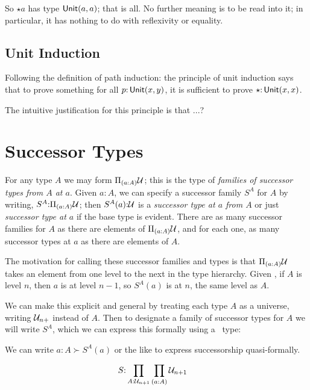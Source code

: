 \documentclass{article}
\begin{document}
So \(\star a\) has type \(\textsf{Unit}(a,a)\); that is all.  No further
meaning is to be read into it; in particular, it has nothing to do
with reflexivity or equality.

\subsection{Unit Induction}

Following the definition of path induction: the principle of unit
induction says that to prove something for all \(p{:}\,\textsf{Unit}(x,y)\),
it is sufficient to prove \(\star{:}\,\textsf{Unit}(x,x)\).

The intuitive justification for this principle is that ...?


\section{Successor Types}

For any type \(A\) we may form \(\Pi_{(a:A)}\mathcal{U}\); this is the type of
\emph{families of successor types from \(A\) at \(a\)}.  Given
\(a{:}A\), we can specify a successor family \(S^A\) for \(A\) by
writing, \(S^A{:}\Pi_{(a:A)}\mathcal{U}\); then \(S^A(a){:}\mathcal{U}\) is a
\emph{successor type at \(a\) from \(A\)} or just \emph{successor type
  at \(a\)} if the base type is evident.  There are as many successor
families for \(A\) as there are elements of \(\Pi_{(a:A)}\mathcal{U}\), and for each
one, as many successor types at \(a\) as there are elements of \(A\).

The motivation for calling these successor families and types is that
\(\Pi_{(a:A)}\mathcal{U}\) takes an element from one level to the next in the type
hierarchy.  Given \aA, if \(A\) is level \(n\), then \(a\) is at level
\(n-1\), so \(S^A(a)\) is at \(n\), the same level as \(A\).

We can make this explicit and general by treating each type \(A\) as a
universe, writing \(\mathcal{U}_{n+}\) instead of \(A\).  Then to designate a
family of successor types for \(A\) we will write \(S^A\), which we
can express this formally using a \Pi\ type:

\begin{remark}
  We can write \(a{:}A\succ S^A(a)\) or the like to express
  successorship quasi-formally.
\end{remark}

\begin{align}
  & S{:}\prod\limits_{A{:}\mathcal{U}_{n+1}}\prod\limits_{(a:A)}\mathcal{U}_{n+1}
\end{align}
\end{document}
